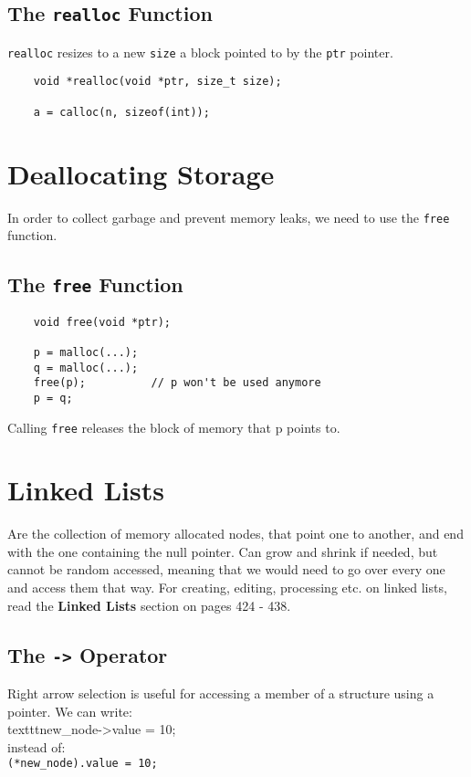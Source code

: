 \documentclass[openany]{book}
\begin{document}
    \subsection*{The \texttt{realloc} Function}
    \texttt{realloc} resizes to a new \texttt{size} a block pointed to by the \texttt{ptr} pointer.
    \begin{lstlisting}
    void *realloc(void *ptr, size_t size);

    a = calloc(n, sizeof(int));
    \end{lstlisting}

    \section{Deallocating Storage}
    In order to collect garbage and prevent memory leaks, we need to use the \texttt{free} function.

    \subsection*{The \texttt{free} Function}

    \begin{lstlisting}
    void free(void *ptr);

    p = malloc(...);
    q = malloc(...);
    free(p);          // p won't be used anymore
    p = q;
    \end{lstlisting}
    Calling \texttt{free} releases the block of memory that p points to.

    \section{Linked Lists}
    Are the collection of memory allocated nodes, that point one to another, and end with the one containing the null pointer. Can grow and shrink if needed, but cannot be random accessed, meaning that we would need to go over every one and access them that way. For creating, editing, processing etc. on linked lists, read the \textbf{Linked Lists} section on pages 424 - 438.

    \subsection*{The \texttt{->} Operator}
    Right arrow selection is useful for accessing a member of a structure using a pointer. We can write: \\
    texttt{new\_node->value = 10;} \\
    instead of: \\
    \texttt{(*new\_node).value = 10;}
\end{document}
